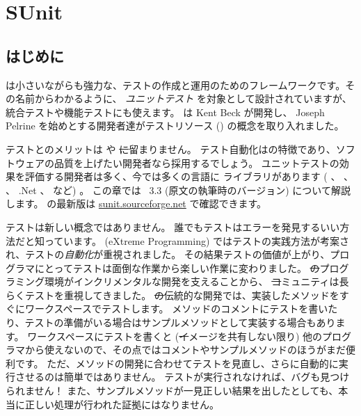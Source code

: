 \documentclass[a4paper,10pt,twoside]{book}
\begin{document}
	\sloppy
\fi
\chapter{SUnit}


\section{はじめに}

 は小さいながらも強力な、テストの作成と運用のためのフレームワークです。その名前からわかるように、 \emph{ユニットテスト} を対象として設計されていますが、統合テストや機能テストにも使えます。 \sunit は Kent Beck が開発し、 Joseph Pelrine を始めとする開発者達がテストリソース () の概念を取り入れました。


テストとのメリットは \pharo や \st に留まりません。
テスト自動化はの特徴であり、ソフトウェアの品質を上げたい開発者なら採用するでしょう。 
ユニットテストの効果を評価する開発者は多く、今では多くの言語に \xUnit{} ライブラリがあります ( 、  、  、 .Net 、 など) 。
この章では \SUnit~3.3 (原文の執筆時のバージョン) について解説します。
\sunit の最新版は \url{sunit.sourceforge.net} で確認できます。

テストは新しい概念ではありません。
誰でもテストはエラーを発見するいい方法だと知っています。
\mbox{} (eXtreme Programming) ではテストの実践方法が考案され、テストの\emph{自動化}が重視されました。
その結果テストの価値が上がり、プログラマにとってテストは面倒な作業から楽しい作業に変わりました。
\st のプログラミング環境がインクリメンタルな開発を支えることから、 \st コミュニティは長らくテストを重視してきました。
\st の伝統的な開発では、実装したメソッドをすぐにワークスペースでテストします。
メソッドのコメントにテストを書いたり、テストの準備がいる場合はサンプルメソッドとして実装する場合もあります。
ワークスペースにテストを書くと (\st イメージを共有しない限り) 他のプログラマから使えないので、その点ではコメントやサンプルメソッドのほうがまだ便利です。
ただ、メソッドの開発に合わせてテストを見直し、さらに自動的に実行させるのは簡単ではありません。
テストが実行されなければ、バグも見つけられません！
また、サンプルメソッドが一見正しい結果を出したとしても、本当に正しい処理が行われた証拠にはなりません。
\end{document}
